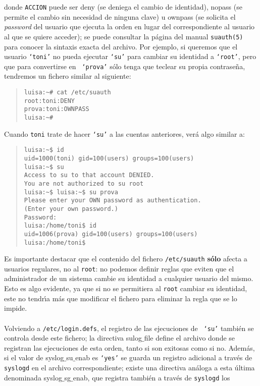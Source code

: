 donde {\tt ACCION} puede ser {\sc deny} (se deniega el cambio de identidad),
{\sc nopass} (se permite el cambio sin necesidad de ninguna clave) u {\sc 
ownpass} (se solicita el {\it password} del usuario que ejecuta la orden en 
lugar del correspondiente al usuario al que se quiere acceder); se puede 
consultar la p\'agina del manual {\tt suauth(5)} para conocer la sintaxis 
exacta del archivo. Por ejemplo,
si queremos que el usuario {\tt `toni'} no pueda ejecutar {\tt `su'} para 
cambiar su identidad a {\tt `root'}, pero que para convertirse en {\tt
`prova'} s\'olo tenga que teclear su propia contrase\~na, tendremos un fichero
similar al siguiente:
\begin{quote}
\begin{verbatim}
luisa:~# cat /etc/suauth 
root:toni:DENY
prova:toni:OWNPASS
luisa:~# 
\end{verbatim}
\end{quote}
Cuando {\tt toni} trate de hacer {\tt `su'} a las cuentas anteriores, ver\'a
algo similar a:
\begin{quote}
\begin{verbatim}
luisa:~$ id
uid=1000(toni) gid=100(users) groups=100(users)
luisa:~$ su 
Access to su to that account DENIED.
You are not authorized to su root
luisa:~$ luisa:~$ su prova
Please enter your OWN password as authentication.
(Enter your own password.)
Password: 
luisa:/home/toni$ id
uid=1006(prova) gid=100(users) groups=100(users)
luisa:/home/toni$
\end{verbatim}
\end{quote}
Es importante destacar que el contenido del fichero {\tt /etc/suauth} {\bf 
s\'olo} afecta a usuarios regulares, no al {\tt root}: no podemos definir 
reglas que eviten que el administrador de un sistema cambie su identidad a 
cualquier usuario del mismo. Esto es algo evidente, ya que si no se permitiera 
al {\tt root} cambiar su identidad, este no tendr\'{\i}a m\'as que modificar el
fichero para eliminar la regla que se lo impide.\\
\\Volviendo a {\tt /etc/login.defs}, el registro de las ejecuciones de {\tt 
`su'} tambi\'en se controla desde este fichero; la directiva {\sc 
sulog$\_$file} define el archivo donde
se registran las ejecuciones de esta orden, tanto si son exitosas como si no.
Adem\'as, si el valor de {\sc syslog$\_$su$\_$enab} es {\tt `yes'} se guarda
un registro adicional a trav\'es de {\tt syslogd} en el archivo 
correspondiente; existe una directiva an\'aloga a esta \'ultima denominada {\sc 
syslog$\_$sg$\_$enab}, que registra tambi\'en a trav\'es de {\tt syslogd} los 
